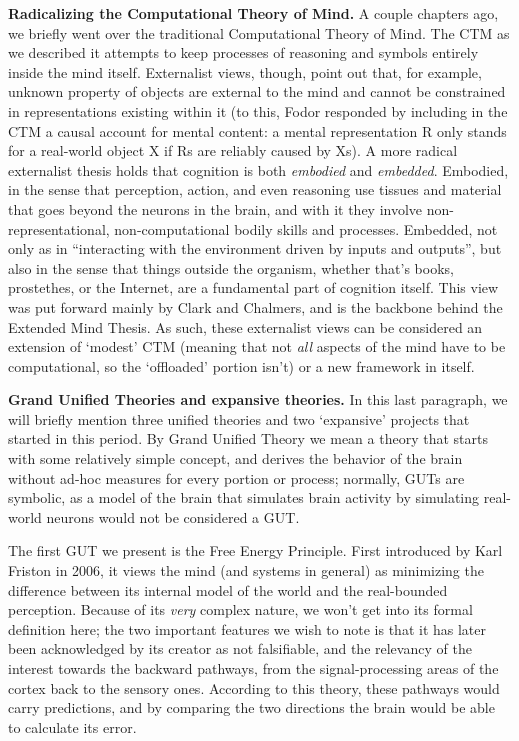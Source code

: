 \documentclass[../main.tex]{subfiles}
\begin{document}
\vspace{4pt}
\textbf{Radicalizing the Computational Theory of Mind.} A couple chapters ago, we briefly went over the traditional Computational Theory of Mind. The CTM as we described it attempts to keep processes of reasoning and symbols entirely inside the mind itself. Externalist views, though, point out that, for example, unknown property of objects are external to the mind and cannot be constrained in representations existing within it (to this, Fodor responded by including in the CTM a causal account for mental content: a mental representation R only stands for a real-world object X if Rs are reliably caused by Xs). A more radical externalist thesis holds that cognition is both \textit{embodied} and \textit{embedded}. Embodied, in the sense that perception, action, and even reasoning use tissues and material that goes beyond the neurons in the brain, and with it they involve non-representational, non-computational bodily skills and processes. Embedded, not only as in ``interacting with the environment driven by inputs and outputs'', but also in the sense that things outside the organism, whether that's books, prostethes, or the Internet, are a fundamental part of cognition itself. This view was put forward mainly by Clark\cite{clarkNaturalbornCyborgsMinds2003} and Chalmers\cite{clarkExtendedMind1998b}, and is the backbone behind the Extended Mind Thesis. As such, these externalist views can be considered an extension of `modest' CTM (meaning that not \textit{all} aspects of the mind have to be computational, so the `offloaded' portion isn't) or a new framework in itself.

\vspace{4pt}
\textbf{Grand Unified Theories and expansive theories.}
In this last paragraph, we will briefly mention three unified theories and two `expansive' projects that started in this period. By Grand Unified Theory we mean a theory that starts with some relatively simple concept, and derives the behavior of the brain without ad-hoc measures for every portion or process; normally, GUTs are symbolic, as a model of the brain that simulates brain activity by simulating real-world neurons would not be considered a GUT.

The first GUT we present is the Free Energy Principle. First introduced by Karl Friston in 2006\cite{fristonFreeEnergyPrinciple2006}, it views the mind (and systems in general) as minimizing the difference between its internal model of the world and the real-bounded perception. Because of its \textit{very} complex nature, we won't get into its formal definition here; the two important features we wish to note is that it has later been acknowledged by its creator as not falsifiable, and the relevancy of the interest towards the backward pathways, from the signal-processing areas of the cortex back to the sensory ones. According to this theory, these pathways would carry predictions, and by comparing the two directions the brain would be able to calculate its error.
\end{document}
